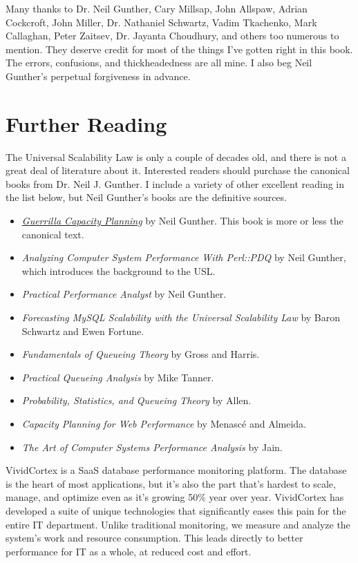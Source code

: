 \documentclass{vivid_layout}
\begin{document}
Many thanks to Dr. Neil Gunther, Cary Millsap, John Allspaw, Adrian Cockcroft,
John Miller, Dr.  Nathaniel Schwartz, Vadim Tkachenko, Mark Callaghan, Peter Zaitsev, Dr.
Jayanta Choudhury, and others too numerous to mention. They deserve credit for
most of the things I've gotten right in this book. The errors, confusions, and
thickheadedness are all mine. I also beg Neil Gunther's perpetual forgiveness in
advance.

\section{Further Reading}

The Universal Scalability Law is only a couple of decades old, and there is not a
great deal of literature about it. Interested readers should purchase the
canonical books from Dr. Neil J. Gunther. I include a variety of other excellent
reading in the list below, but Neil Gunther's books are the definitive sources.

\begin{itemize}
\item \href{http://www.springer.com/book/978-3-540-26138-4}{\itshape Guerrilla Capacity Planning} by Neil Gunther. This book is more or less the canonical text.
\item {\itshape Analyzing Computer System Performance With Perl::PDQ} by Neil
Gunther, which introduces the background to the USL.
\item {\itshape Practical Performance Analyst} by Neil Gunther.
\item {\itshape Forecasting MySQL Scalability with the Universal Scalability Law} by Baron Schwartz and Ewen Fortune.
\item {\itshape Fundamentals of Queueing Theory} by Gross and Harris.
\item {\itshape Practical Queueing Analysis} by Mike Tanner.
\item {\itshape Probability, Statistics, and Queueing Theory} by Allen.
\item {\itshape Capacity Planning for Web Performance} by Menasc\'e and Almeida.
\item {\itshape The Art of Computer Systems Performance Analysis} by Jain.
\end{itemize}

\newpage

\begin{about}	%
VividCortex is a SaaS database performance monitoring platform. The database is the heart of most applications, but it's also the part that's hardest to scale, manage, and optimize even as it's growing 50\% year over year. VividCortex has developed a suite of unique technologies that significantly eases this pain for the entire IT department. Unlike traditional monitoring, we measure
and analyze the system's work and resource consumption. This leads directly to better performance for IT as a whole, at reduced cost and effort.
\end{about}
\makeresources	%
\end{document}
